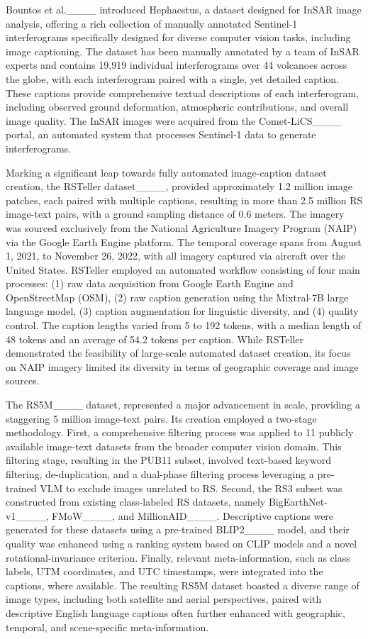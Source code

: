 Bountos et al.____ introduced Hephaestus, a dataset designed for InSAR image analysis, offering a rich collection of manually annotated Sentinel-1 interferograms specifically designed for diverse computer vision tasks, including image captioning. The dataset has been manually annotated by a team of InSAR experts and contains 19,919 individual interferograms over 44 volcanoes across the globe, with each interferogram paired with a single, yet detailed caption. These captions provide comprehensive textual descriptions of each interferogram, including observed ground deformation, atmospheric contributions, and overall image quality. The InSAR images were acquired from the Comet-LiCS____ portal, an automated system that processes Sentinel-1 data to generate interferograms.

Marking a significant leap towards fully automated image-caption dataset creation, the RSTeller dataset____, provided approximately 1.2 million image patches, each paired with multiple captions, resulting in more than 2.5 million RS image-text pairs, with a ground sampling distance of 0.6 meters. The imagery was sourced exclusively from the National Agriculture Imagery Program (NAIP) via the Google Earth Engine platform. The temporal coverage spans from August 1, 2021, to November 26, 2022, with all imagery captured via aircraft over the United States. RSTeller employed an automated workflow consisting of four main processes: (1) raw data acquisition from Google Earth Engine and OpenStreetMap (OSM), (2) raw caption generation using the Mixtral-7B large language model, (3) caption augmentation for linguistic diversity, and (4) quality control. The caption lengths varied from 5 to 192 tokens, with a median length of 48 tokens and an average of 54.2 tokens per caption. While RSTeller demonstrated the feasibility of large-scale automated dataset creation, its focus on NAIP imagery limited its diversity in terms of geographic coverage and image sources.

The RS5M____ dataset, represented a major advancement in scale, providing a staggering 5 million image-text pairs. Its creation employed a two-stage methodology. First, a comprehensive filtering process was applied to 11 publicly available image-text datasets from the broader computer vision domain. This filtering stage, resulting in the PUB11 subset, involved text-based keyword filtering, de-duplication, and a dual-phase filtering process leveraging a pre-trained VLM to exclude images unrelated to RS. Second, the RS3 subset was constructed from existing class-labeled RS datasets, namely BigEarthNet-v1____, FMoW____, and MillionAID____. Descriptive captions were generated for these datasets using a pre-trained BLIP2____ model, and their quality was enhanced using a ranking system based on CLIP models and a novel rotational-invariance criterion. Finally, relevant meta-information, such as class labels, UTM coordinates, and UTC timestamps, were integrated into the captions, where available. The resulting RS5M dataset boasted a diverse range of image types, including both satellite and aerial perspectives, paired with descriptive English language captions often further enhanced with geographic, temporal, and scene-specific meta-information.

